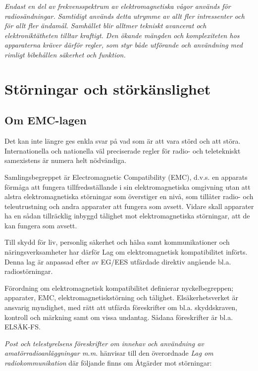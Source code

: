 \emph{Endast en del av frekvensspektrum av elektromagnetiska vågor
  används för radiosändningar. Samtidigt används detta utrymme av allt
  fler intressenter och för allt fler ändamål.  Samhället blir alltmer
  tekniskt avancerat och elektroniktätheten tilltar kraftigt. Den
  ökande mängden och komplexiteten hos apparaterna kräver därför
  regler, som styr både utförande och användning med rimligt
  bibehållen säkerhet och funktion.}

\section{Störningar och störkänslighet}

\subsection{Om EMC-lagen}

Det kan inte längre ges enkla svar på vad som är att vara störd och
att störa. Internationella och nationella väl preciserade regler för
radio- och teletekniskt samexistens är numera helt nödvändiga.

Samlingsbegreppet är Electromagnetic Compatibility (EMC), d.v.s. en
apparats förmåga att fungera tillfredsställande i sin
elektromagnetiska omgivning utan att alstra elektromagnetiska
störningar som överstiger en nivå, som tillåter radio- och
teleutrustning och andra apparater att fungera som avsett.  Vidare
skall apparater ha en sådan tillräcklig inbyggd tålighet mot
elektromagnetiska störningar, att de kan fungera som avsett.

Till skydd för liv, personlig säkerhet och hälsa samt kommunikationer
och näringsverksamheter har därför Lag om elektromagnetisk
kompatibilitet införts. Denna lag är anpassad efter av EG/EES
utfärdade direktiv angående bl.a. radiostörningar.

Förordning om elektromagnetisk kompatibilitet definierar
nyckelbegreppen; apparater, EMC, elektromagnetiskstörning och
tålighet. Elsäkerhetsverket är ansvarig myndighet, med rätt att
utfärda föreskrifter om bl.a. skyddskraven, kontroll och märkning samt
om vissa undantag. Sådana föreskrifter är bl.a. ELSÄK-FS.

\emph{Post och telestyrelsens föreskrifter om innehav och användning
  av amatörradioanläggningar m.m.} hänvisar till den överordnade
\emph{Lag om radiokommunikation} där följande finns om Åtgärder mot
störningar:


